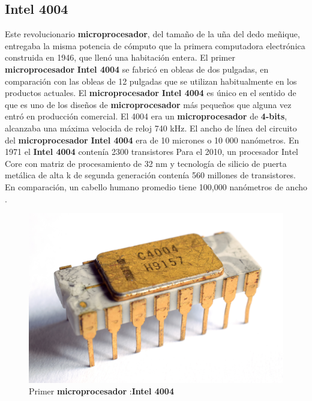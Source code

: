 \subsection{Intel 4004}
Este revolucionario \textbf{microprocesador}, del tamaño de la uña del dedo meñique, entregaba la misma potencia de cómputo que la primera
computadora electrónica construida en 1946, que llenó una habitación entera. El primer \textbf{microprocesador} \textbf{Intel 4004} se
fabricó en obleas de dos pulgadas, en comparación con las obleas de 12 pulgadas que se utilizan habitualmente en los productos actuales.
El \textbf {microprocesador} \textbf{Intel 4004} es único en el sentido de que es uno de los diseños de \textbf{microprocesador} más
pequeños que alguna vez entró en producción comercial. El 4004  era un \textbf{microprocesador} de \textbf{4-bits}, alcanzaba una máxima
velocida de reloj 740 kHz. El ancho de línea del circuito del \textbf{microprocesador} \textbf{Intel 4004} era de 10 micrones o 10 000
nanómetros. En 1971 el \textbf{Intel 4004} contenía 2300 transistores Para el 2010, un procesador Intel Core con matriz de procesamiento
de 32 nm y tecnología de silicio de puerta metálica de alta k de segunda generación contenía  560 millones de transistores. En comparación,
un cabello humano promedio tiene 100,000 nanómetros de ancho .      

\begin{figure}[htb]
	\centering
	\includegraphics[scale = 0.15]{Graphics/Intel_C4004.jpg}
	\caption{Primer \textbf{microprocesador} :\textbf{Intel 4004}}
	\label{fig:12}
\end{figure}


